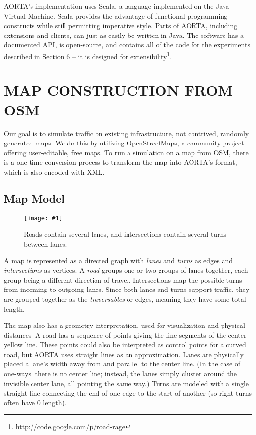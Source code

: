 \documentclass[letterpaper, 10 pt, conference]{ieeeconf}  %
\newcommand{\pix}[3]{
  \begin{figure}[h]
    \centering \texttt{[image: \#1]}
    \caption{#2}
  \end{figure}
}
\begin{document}
AORTA's implementation uses Scala, a language implemented on the Java Virtual
Machine. Scala provides the advantage of functional programming constructs while
still permitting imperative style. Parts of AORTA, including extensions and clients, can
just as easily be written in Java. The software has a documented API, is open-source, and
contains all of the code for the experiments described in Section 6 -- it is
designed for extensibility\footnote{http://code.google.com/p/road-rage}.


\section{MAP CONSTRUCTION FROM OSM}

Our goal is to simulate traffic on existing infrastructure, not contrived,
randomly generated maps. We do this by utilizing OpenStreetMaps, a community
project offering user-editable, free maps. To run a simulation on a map from
OSM, there is a one-time conversion process to transform the map into AORTA's
format, which is also encoded with XML.

\subsection{Map Model}

\pix{map_model.png}
    {Roads contain several lanes, and intersections contain several turns
     between lanes.}
    {scale=0.5}


A map is represented as a directed graph with \emph{lanes} and \emph{turns} as edges and
\emph{intersections} as vertices. A \emph{road} groups one or two groups of
lanes together, each group being a different direction of travel. Intersections
map the possible turns from incoming to outgoing lanes. Since both lanes and
turns support traffic, they are grouped together as the \emph{traversables} or
edges, meaning they have some total length.

The map also has a geometry interpretation, used for visualization and physical
distances. A road has a sequence of points giving the line segments of the
center yellow line. These points could also be interpreted as control points for
a curved road, but AORTA uses straight lines as an approximation. Lanes are
physically placed a lane's width away from and parallel to the center line. (In
the case of one-ways, there is no center line; instead, the lanes simply cluster
around the invisible center lane, all pointing the same way.) Turns are modeled
with a single straight line connecting the end of one edge to the start of
another (so right turns often have $0$ length). 
\end{document}
